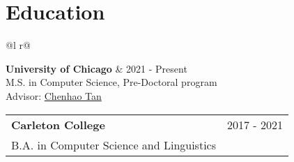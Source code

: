 
\section{Education}





\begin{tabularx}{\linewidth}{@{}l r@{}}	




\textbf{University of Chicago}   &     \hspace{3.5mm} 2021 - Present\\
M.S. in Computer Science, Pre-Doctoral program \\
Advisor: \href{https://chenhaot.com/}{Chenhao Tan} \\ 

\end{tabularx}






\begin{tabularx}{\linewidth}{@{}l r@{}}	
\textbf{Carleton College}        &   \hspace{87mm} 2017 - 2021         \\
B.A. in Computer Science and Linguistics 



\end{tabularx}